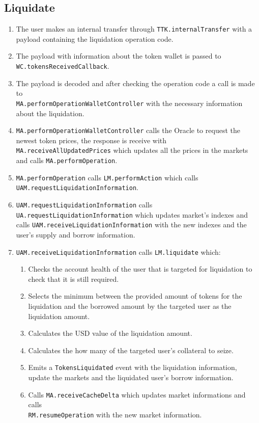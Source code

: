 \subsection{Liquidate}
\begin{enumerate}
  \item The user makes an internal transfer through \verb|TTK.internalTransfer| with a payload containing the liquidation operation code.
  \item The payload with information about the token wallet is passed to \verb|WC.tokensReceivedCallback|.
  \item The payload is decoded and after checking the operation code a call is made to \\\verb|MA.performOperationWalletController| with the necessary information about the liquidation.
  \item \verb|MA.performOperationWalletController| calls the Oracle to request the newest token prices, the response is receive with \verb|MA.receiveAllUpdatedPrices| which updates all the prices in the markets and calls \verb|MA.performOperation|.
  \item \verb|MA.performOperation| calls \verb|LM.performAction| which calls \\\verb|UAM.requestLiquidationInformation|.
  \item \verb|UAM.requestLiquidationInformation| calls \verb|UA.requestLiquidationInformation| which updates market's indexes and calls \verb|UAM.receiveLiquidationInformation| with the new indexes and the user's supply and borrow information.
  \item \verb|UAM.receiveLiquidationInformation| calls \verb|LM.liquidate| which:
  \begin{enumerate}
    \item Checks the account health of the user that is targeted for liquidation to check that it is still required.
    \item Selects the minimum between the provided amount of tokens for the liquidation and the borrowed amount by the targeted user as the liquidation amount.
    \item Calculates the USD value of the liquidation amount.
    \item Calculates the how many of the targeted user's collateral to seize.
    \item Emits a \verb|TokensLiquidated| event with the liquidation information, update the markets and the liquidated user's borrow information.
    \item Calls \verb|MA.receiveCacheDelta| which updates market informations and calls \\\verb|RM.resumeOperation| with the new market information.

\end{enumerate}
\end{enumerate}
